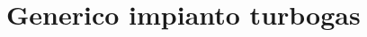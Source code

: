 \documentclass[a4paper, 15pt]{article}
\begin{document}
\newpage


		
		\newpage
		
		\section{Generico impianto turbogas}
		
\end{document}
